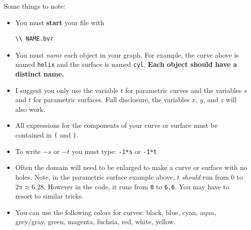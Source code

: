 \documentclass{ximera}
\begin{document}
Some things to note: 
\begin{itemize}
\item You must \textbf{start} your file with
\begin{verbatim}
\\ NAME.bvr
\end{verbatim}
  \item You must \textit{name} each object in your graph. For example,
    the curve above is named \verb|helix| and the surface is named
    \verb|cyl|. \textbf{Each object should have a distinct name.}
  \item I suggest you only use the variable $t$ for parametric curves
    and the variables $s$ and $t$ for parametric surfaces. Full
    disclosure, the variables $x$, $y$, and $z$ will also work.
  \item All expressions for the components of your curve or surface
    must be contained in \verb|(| and \verb|)|.
  \item To write $-s$ or $-t$ you must type: \verb|-1*s| or \verb|-1*t|
  \item Often the domain will need to be enlarged to make a curve or
    surface with no holes. Note, in the parametric surface example
    above, $t$ \textit{should} run from $0$ to $2\pi\approx
    6.28$. However in the code, it runs from \verb|0| to
    \verb|6.6|. You may have to resort to similar tricks.
  \item You can use the following colors for curves: black, blue,
    cyan, aqua, grey/gray, green, magenta, fuchsia, red, white,
    yellow.
\end{itemize}
\end{document}
